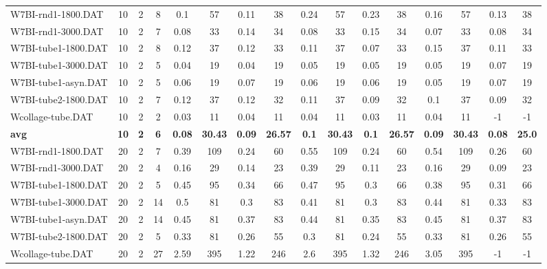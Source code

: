 \begin{sidewaystable}[!ht]
{\begin{tabular}{lccccccccccccccc}
W7BI-rnd1-1800.DAT & 10 & 2 & 8 &  \textcolor{blue2}{0.1} & 57 & 0.11 & 38 & 0.24 & 57 & 0.23 & 38 & 0.16 & 57 & 0.13 & 38 \\
W7BI-rnd1-3000.DAT & 10 & 2 & 7 & 0.08 & 33 & 0.14 & 34 & 0.08 & 33 & 0.15 & 34 &  \textcolor{blue2}{0.07} & 33 & 0.08 & 34 \\
W7BI-tube1-1800.DAT & 10 & 2 & 8 & 0.12 & 37 & 0.12 & 33 & 0.11 & 37 &  \textcolor{blue2}{0.07} & 33 & 0.15 & 37 & 0.11 & 33 \\
W7BI-tube1-3000.DAT & 10 & 2 & 5 &  \textcolor{blue2}{0.04} & 19 &  \textcolor{blue2}{0.04} & 19 & 0.05 & 19 & 0.05 & 19 & 0.05 & 19 & 0.07 & 19 \\
W7BI-tube1-asyn.DAT & 10 & 2 & 5 & 0.06 & 19 & 0.07 & 19 & 0.06 & 19 & 0.06 & 19 &  \textcolor{blue2}{0.05} & 19 & 0.07 & 19 \\
W7BI-tube2-1800.DAT & 10 & 2 & 7 & 0.12 & 37 & 0.12 & 32 & 0.11 & 37 &  \textcolor{blue2}{0.09} & 32 & 0.1 & 37 &  \textcolor{blue2}{0.09} & 32 \\
Wcollage-tube.DAT & 10 & 2 & 2 &  \textcolor{blue2}{0.03} & 11 & 0.04 & 11 & 0.04 & 11 &  \textcolor{blue2}{0.03} & 11 & 0.04 & 11 & -1 & -1 \\
\cline{1-16} \textbf{avg} & \textbf{10} & \textbf{2} & \textbf{6} & \textbf{0.08} & \textbf{30.43} & \textbf{0.09} & \textbf{26.57} & \textbf{0.1} & \textbf{30.43} & \textbf{0.1} & \textbf{26.57} & \textbf{0.09} & \textbf{30.43} & \textbf{0.08} & \textbf{25.0} \\ \cline{1-16}
W7BI-rnd1-1800.DAT & 20 & 2 & 7 & 0.39 & 109 &  \textcolor{blue2}{0.24} & 60 & 0.55 & 109 &  \textcolor{blue2}{0.24} & 60 & 0.54 & 109 & 0.26 & 60 \\
W7BI-rnd1-3000.DAT & 20 & 2 & 4 & 0.16 & 29 & 0.14 & 23 & 0.39 & 29 & 0.11 & 23 & 0.16 & 29 &  \textcolor{blue2}{0.09} & 23 \\
W7BI-tube1-1800.DAT & 20 & 2 & 5 & 0.45 & 95 & 0.34 & 66 & 0.47 & 95 &  \textcolor{blue2}{0.3} & 66 & 0.38 & 95 & 0.31 & 66 \\
W7BI-tube1-3000.DAT & 20 & 2 & 14 & 0.5 & 81 &  \textcolor{blue2}{0.3} & 83 & 0.41 & 81 &  \textcolor{blue2}{0.3} & 83 & 0.44 & 81 & 0.33 & 83 \\
W7BI-tube1-asyn.DAT & 20 & 2 & 14 & 0.45 & 81 & 0.37 & 83 & 0.44 & 81 &  \textcolor{blue2}{0.35} & 83 & 0.45 & 81 & 0.37 & 83 \\
W7BI-tube2-1800.DAT & 20 & 2 & 5 & 0.33 & 81 & 0.26 & 55 & 0.3 & 81 &  \textcolor{blue2}{0.24} & 55 & 0.33 & 81 & 0.26 & 55 \\
Wcollage-tube.DAT & 20 & 2 & 27 & 2.59 & 395 &  \textcolor{blue2}{1.22} & 246 & 2.6 & 395 & 1.32 & 246 & 3.05 & 395 & -1 & -1 \\

\end{tabular}}
\end{sidewaystable}
